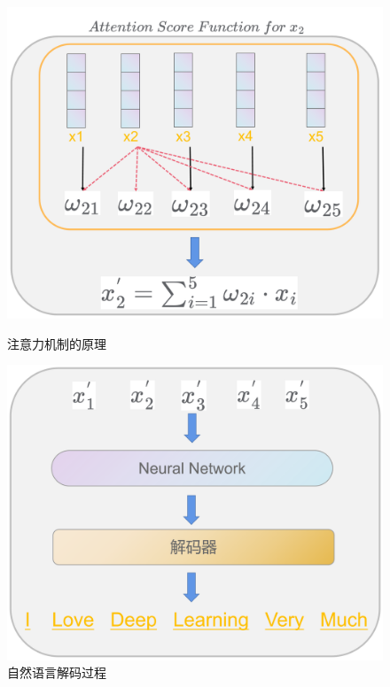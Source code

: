 \begin{figure}[h]
	\begin{minipage}[t]{0.5\linewidth}
		\centering
		\includegraphics[scale=0.25]{image/chap03/img305.png}
		\caption{注意力机制的原理}
		\label{img305}
	\end{minipage}%
	\begin{minipage}[t]{0.5\linewidth}
		\centering
		\includegraphics[scale=0.25]{image/chap03/img306.png}
		\caption{自然语言解码过程}
		\label{img306}
	\end{minipage}
\end{figure}

